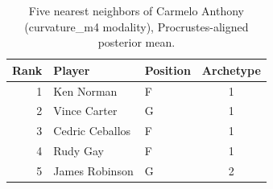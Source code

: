 \begin{table}[htbp]
  \centering\small
  \begin{tabular}{rllc}
    \toprule
    Rank & Player & Position & Archetype \\
    \midrule
    1 & Ken Norman & F & 1 \\
    2 & Vince Carter & G & 1 \\
    3 & Cedric Ceballos & F & 1 \\
    4 & Rudy Gay & F & 1 \\
    5 & James Robinson & G & 2 \\
    \bottomrule
  \end{tabular}
  \caption{Five nearest neighbors of Carmelo Anthony (curvature_m4 modality), Procrustes-aligned posterior mean.}
  \label{tab:Carmelo_Anthony_neighbors_curvature_m4}
\end{table}

